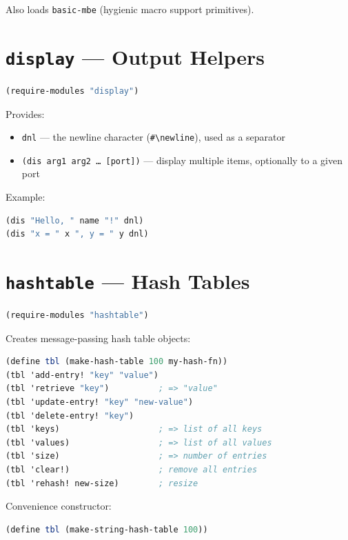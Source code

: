 \documentclass[12pt]{report}
\begin{document}
Also loads {\tt basic-mbe} (hygienic macro support primitives).

\section{{\tt display} --- Output Helpers}

\begin{lstlisting}[language=Scheme]
(require-modules "display")
\end{lstlisting}

\noindent Provides:
\begin{itemize}
\item {\tt dnl} --- the newline character ({\tt \#\textbackslash newline}),
  used as a separator
\item {\tt (dis arg1 arg2 \ldots\ [port])} --- display multiple items,
  optionally to a given port
\end{itemize}

\noindent Example:
\begin{lstlisting}[language=Scheme]
(dis "Hello, " name "!" dnl)
(dis "x = " x ", y = " y dnl)
\end{lstlisting}

\section{{\tt hashtable} --- Hash Tables}

\begin{lstlisting}[language=Scheme]
(require-modules "hashtable")
\end{lstlisting}

Creates message-passing hash table objects:

\begin{lstlisting}[language=Scheme]
(define tbl (make-hash-table 100 my-hash-fn))
(tbl 'add-entry! "key" "value")
(tbl 'retrieve "key")          ; => "value"
(tbl 'update-entry! "key" "new-value")
(tbl 'delete-entry! "key")
(tbl 'keys)                    ; => list of all keys
(tbl 'values)                  ; => list of all values
(tbl 'size)                    ; => number of entries
(tbl 'clear!)                  ; remove all entries
(tbl 'rehash! new-size)        ; resize
\end{lstlisting}

\noindent Convenience constructor:
\begin{lstlisting}[language=Scheme]
(define tbl (make-string-hash-table 100))
\end{lstlisting}
\end{document}
